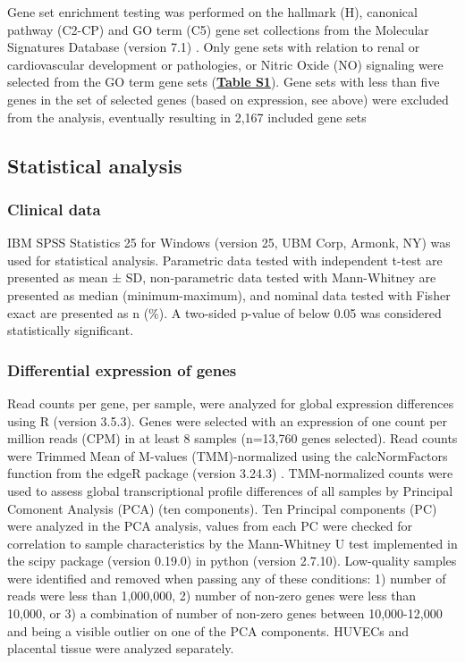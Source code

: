 \documentclass[authordate, empirical]{jote-new-article}
\begin{document}
Gene set enrichment testing was performed on the hallmark (H), canonical pathway (C2-CP) and GO term (C5) gene set collections from the Molecular Signatures Database (version 7.1) \parencites{Wu2012}{Liberzon2016}. Only gene sets with relation to renal or cardiovascular development or pathologies, or Nitric Oxide (NO) signaling were selected from the GO term gene sets (\textbf{\href{https://journal.trialanderror.org/pub/prenatal-sildenafil-pregnancies\#supplementary-materials}{Table S1}}). Gene sets with less than five genes in the set of selected genes (based on expression, see above) were excluded from the analysis, eventually resulting in 2,167 included gene sets







\subsection{Statistical analysis}



\subsubsection{Clinical data}



IBM SPSS Statistics 25 for Windows (version 25, UBM Corp, Armonk, NY) was used for statistical analysis. Parametric data tested with independent t-test are presented as mean ± SD, non-parametric data tested with Mann-Whitney are presented as median (minimum-maximum), and nominal data tested with Fisher exact are presented as n (\%). A two-sided p-value of below 0.05 was considered statistically significant.


\subsubsection{Differential expression of genes}



Read counts per gene, per sample, were analyzed for global expression differences using R (version 3.5.3). Genes were selected with an expression of one count per million reads (CPM) in at least 8 samples (n=13,760 genes selected). Read counts were Trimmed Mean of M-values (TMM)-normalized using the calcNormFactors function from the edgeR package (version 3.24.3) \parencites{Robinson2010}. TMM-normalized counts were used to assess global transcriptional profile differences of all samples by Principal Comonent Analysis (PCA) (ten components). Ten Principal components (PC) were analyzed in the PCA analysis, values from each PC were checked for correlation to sample characteristics by the Mann-Whitney U test implemented in the scipy package (version 0.19.0) in python (version 2.7.10). Low-quality samples were identified and removed when passing any of these conditions: 1) number of reads were less than 1,000,000, 2) number of non-zero genes were less than 10,000, or 3) a combination of number of non-zero genes between 10,000-12,000 and being a visible outlier on one of the PCA components. HUVECs and placental tissue were analyzed separately.
\end{document}
